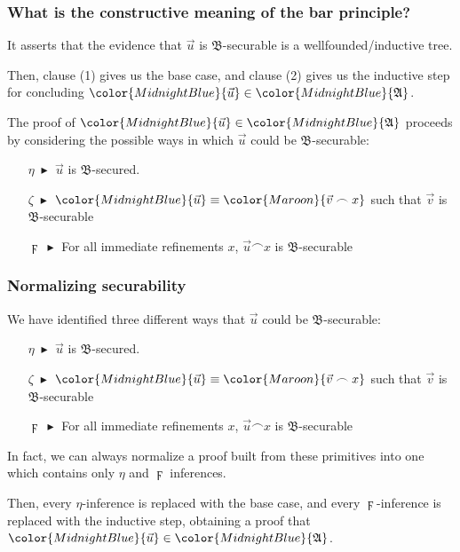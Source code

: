 \documentclass[10pt]{beamer}
\def\InputModeColorName{MidnightBlue}
\def\OutputModeColorName{Maroon}
\newcommand\IMode[1]{{\color{\InputModeColorName}{#1}}}
\newcommand\OMode[1]{{\color{\OutputModeColorName}{#1}}}
\newcommand\Member[2]{\IMode{#1}\in \IMode{#2}}
\begin{document}
\begin{frame}
  \frametitle{What is the constructive meaning of the bar principle?}

  It asserts that the \alert{evidence} that $\vec{u}$ is
  $\mathfrak{B}$-securable is a wellfounded/inductive tree.

  \medskip
  \pause

  Then, clause (1) gives us the \alert{base case}, and clause (2) gives us the
  \alert{inductive step} for concluding $\Member{\vec{u}}{\mathfrak{A}}$.

  \medskip
  \pause

  The proof of $\Member{\vec{u}}{\mathfrak{A}}$ proceeds by considering the possible ways in which $\vec{u}$ could be $\mathfrak{B}$-securable:
  \begin{itemize}
    \item[$\eta\;\blacktriangleright$]
      $\vec{u}$ is $\mathfrak{B}$-secured.
    \item[$\zeta\;\blacktriangleright$]
      $\IMode{\vec{u}}\equiv\OMode{\vec{v}\frown x}$ such that $\vec{v}$ is $\mathfrak{B}$-securable
    \item[$\digamma\;\blacktriangleright$]
      For all immediate refinements $x$, $\vec{u}\frown x$ is $\mathfrak{B}$-securable
  \end{itemize}

\end{frame}
\begin{frame}
  \frametitle{Normalizing securability}

  We have identified three different ways that $\vec{u}$ could be $\mathfrak{B}$-securable:
  \medskip

  \begin{itemize}
    \item[$\eta\;\blacktriangleright$]
      $\vec{u}$ is $\mathfrak{B}$-secured.
    \item[$\zeta\;\blacktriangleright$]
      $\IMode{\vec{u}}\equiv\OMode{\vec{v}\frown x}$ such that $\vec{v}$ is $\mathfrak{B}$-securable
    \item[$\digamma\;\blacktriangleright$]
      For all immediate refinements $x$, $\vec{u}\frown x$ is $\mathfrak{B}$-securable
  \end{itemize}

  \medskip
  \pause

  \alert{In fact, we can always normalize a proof built from these primitives into one
  which contains only $\eta$ and $\digamma$ inferences.}

  \medskip
  \pause

  Then, every $\eta$-inference is replaced with the \alert{base case}, and
  every $\digamma$-inference is replaced with the \alert{inductive step}, obtaining
  a proof that $\Member{\vec{u}}{\mathfrak{A}}$.
\end{frame}
\end{document}
